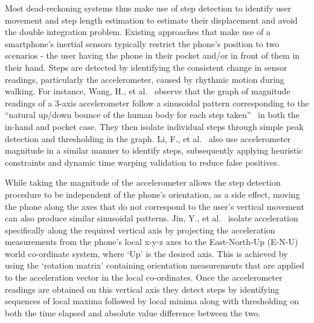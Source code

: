 \documentclass[12pt,a4paper]{report}
\begin{document}
Most dead-reckoning systems thus make use of step detection to identify user movement and step length estimation to estimate their displacement and avoid the double integration problem. Existing approaches that make use of a smartphone’s inertial sensors typically restrict the phone’s position to two scenarios - the user having the phone in their pocket and/or in front of them in their hand. Steps are detected by identifying the consistent change in sensor readings, particularly the accelerometer, caused by rhythmic motion during walking. For instance, Wang, H., et al.~\cite{wang2012no} observe that the graph of magnitude readings of a 3-axis accelerometer follow a sinusoidal pattern corresponding to the ``natural up/down bounce of the human body for each step taken''~\cite[p.203]{wang2012no} in both the in-hand and pocket case. They then isolate individual steps through simple peak detection and thresholding in the graph. Li, F., et al.~\cite{li2012reliable} also use accelerometer magnitude in a similar manner to identify steps, subsequently applying heuristic constraints and dynamic time warping validation to reduce false positives.  

While taking the magnitude of the accelerometer allows the step detection procedure to be independent of the phone’s orientation, as a side effect, moving the phone along the axes that do not correspond to the user’s vertical movement can also produce similar sinusoidal patterns. Jin, Y., et al.~\cite{jin2011robust} isolate acceleration specifically along the required vertical axis by projecting the acceleration measurements from the phone’s local x-y-z axes to the East-North-Up (E-N-U) world co-ordinate system, where `Up' is the desired axis.  This is achieved by using the `rotation matrix' containing orientation measurements that are applied to the acceleration vector in the local co-ordinates. Once the accelerometer readings are obtained on this vertical axis they detect steps by identifying sequences of local maxima followed by local minima along with thresholding on both the time elapsed and absolute value difference between the two. 
\end{document}
